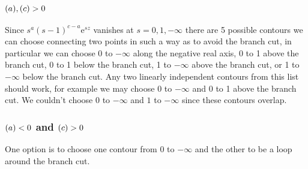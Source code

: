 \documentclass[fleqn]{NotesClass}
\newcommand*{\e}{\mathrm{e}}
\let\Re\relax
\DeclareMathOperator{\Re}{Re}
\begin{document}
    \subsubsection{\texorpdfstring{\(\Re(a), \Re(c) > 0\)}{Re(a) and Re(c) Positive}}
    Since \(s^{a}(s-1)^{c-a}\e^{sz}\) vanishes at \(s = 0, 1, -\infty\) there are 5 possible contours we can choose connecting two points in such a way as to avoid the branch cut, in particular we can choose 0 to \(-\infty\) along the negative real axis, 0 to 1 above the branch cut, 0 to 1 below the branch cut, 1 to \(-\infty\) above the branch cut, or 1 to \(-\infty\) below the branch cut.
    Any two linearly independent contours from this list should work, for example we may choose 0 to \(-\infty\) and 0 to 1 above the branch cut.
    We couldn't choose \(0\) to \(-\infty\) and \(1\) to \(-\infty\) since these contours overlap.
    
    \subsubsection{\texorpdfstring{\(\Re(a) < 0\) and \(\Re(c) > 0\)}{Re(a) Negative and Re(c) Positive}}
    One option is to choose one contour from \(0\) to \(-\infty\) and the other to be a loop around the branch cut.
    
\end{document}
